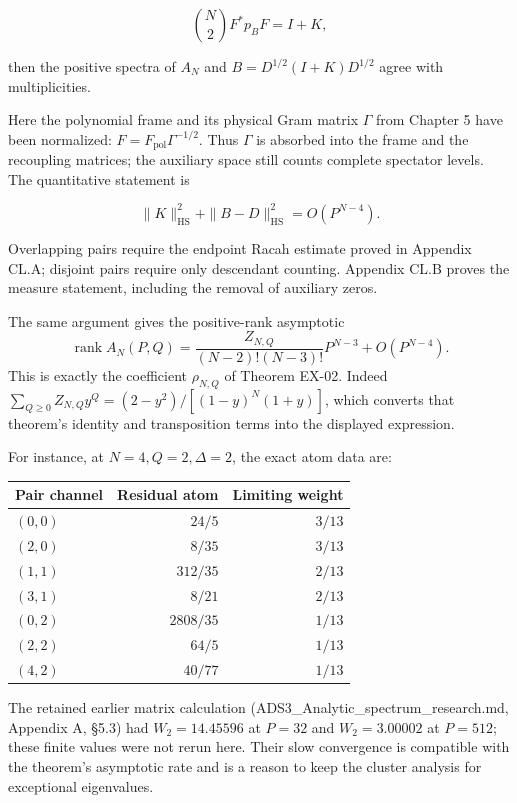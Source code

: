 \documentclass[a4paper,11pt]{article}
\numberwithin{equation}{section}
\begin{document}
\[
\binom N2 F^*p_BF=I+K,
\]

then the positive spectra of \(A_N\) and \(B=D^{1/2}(I+K)D^{1/2}\) agree with multiplicities.

Here the polynomial frame and its physical Gram matrix \(\Gamma\) from Chapter 5 have been normalized: \(F=F_{\mathrm{pol}}\Gamma^{-1/2}\). Thus \(\Gamma\) is absorbed into the frame and the recoupling matrices; the auxiliary space still counts complete spectator levels. The quantitative statement is

\[
\|K\|_{\mathrm{HS}}^2+\|B-D\|_{\mathrm{HS}}^2=O(P^{N-4}).
\tag{CL.3}
\]

Overlapping pairs require the endpoint Racah estimate proved in Appendix CL.A; disjoint pairs require only descendant counting. Appendix CL.B proves the measure statement, including the removal of auxiliary zeros.

The same argument gives the positive-rank asymptotic \[
\operatorname{rank}A_N(P,Q)=
\frac{Z_{N,Q}}{(N-2)!(N-3)!}P^{N-3}+O(P^{N-4}).
\] This is exactly the coefficient \(\rho_{N,Q}\) of Theorem EX-02. Indeed \(\sum_{Q\geq0}Z_{N,Q}y^Q=(2-y^2)/[(1-y)^N(1+y)]\), which converts that theorem's identity and transposition terms into the displayed expression.

For instance, at \(N=4,Q=2,\Delta=2\), the exact atom data are:

\begin{longtable}[]{@{}lrr@{}}
\toprule\noalign{}
Pair channel & Residual atom & Limiting weight \\
\midrule\noalign{}
\endhead
\bottomrule\noalign{}
\endlastfoot
\((0,0)\) & \(24/5\) & \(3/13\) \\
\((2,0)\) & \(8/35\) & \(3/13\) \\
\((1,1)\) & \(312/35\) & \(2/13\) \\
\((3,1)\) & \(8/21\) & \(2/13\) \\
\((0,2)\) & \(2808/35\) & \(1/13\) \\
\((2,2)\) & \(64/5\) & \(1/13\) \\
\((4,2)\) & \(40/77\) & \(1/13\) \\
\end{longtable}

The retained earlier matrix calculation (ADS3\_Analytic\_spectrum\_research.md, Appendix A, §5.3) had \(W_2=14.45596\) at \(P=32\) and \(W_2=3.00002\) at \(P=512\); these finite values were not rerun here. Their slow convergence is compatible with the theorem's asymptotic rate and is a reason to keep the cluster analysis for exceptional eigenvalues.
\end{document}
